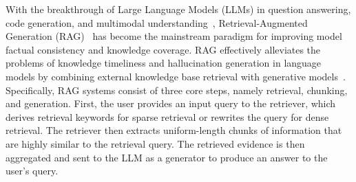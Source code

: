 

With the breakthrough of Large Language Models (LLMs) in question answering, code generation, and multimodal understanding~\citep{gao2023retrieval,wang2025think,wang2026efficient,li2026arise}, Retrieval-Augmented Generation (RAG)~\citep{lewis2020retrieval} has become the mainstream paradigm for improving model factual consistency and knowledge coverage.
RAG effectively alleviates the problems of knowledge timeliness and hallucination generation in language models by combining external knowledge base retrieval with generative models~\citep{wang2023augmenting,zhang2026tdarc}. 
Specifically, RAG systems consist of three core steps, namely retrieval, chunking, and generation.
First, the user provides an input query to the retriever, which derives retrieval keywords for sparse retrieval or rewrites the query for dense retrieval.
The retriever then extracts uniform-length chunks of information that are highly similar to the retrieval query.
The retrieved evidence is then aggregated and sent to the LLM as a generator to produce an answer to the user's query.


